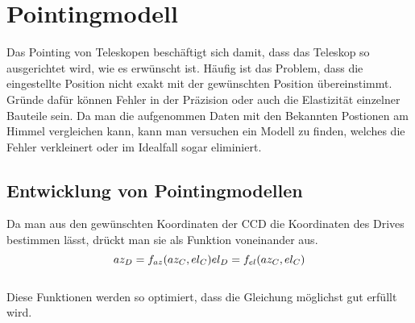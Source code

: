 \chapter{Pointingmodell}
Das Pointing von Teleskopen beschäftigt sich damit, dass das Teleskop so ausgerichtet wird, wie es erwünscht ist. Häufig ist das Problem, dass die eingestellte Position nicht exakt mit der gewünschten Position übereinstimmt. Gründe dafür können Fehler in der Präzision oder auch die Elastizität einzelner Bauteile sein. Da man die aufgenommen Daten mit den Bekannten Postionen am Himmel vergleichen kann, kann man versuchen ein Modell zu finden, welches die Fehler verkleinert oder im Idealfall sogar eliminiert.

\section{Entwicklung von Pointingmodellen}
Da man aus den gewünschten Koordinaten der CCD die Koordinaten des Drives bestimmen lässt, drückt man sie als Funktion voneinander aus.
\begin{equation}
az_D=f_{az}(az_C,el_C)\\
el_D=f_{el}(az_C,el_C)
\label{eq:pointingprinciple}
\end{equation}\\
Diese Funktionen werden so optimiert, dass die Gleichung möglichst gut erfüllt wird.

